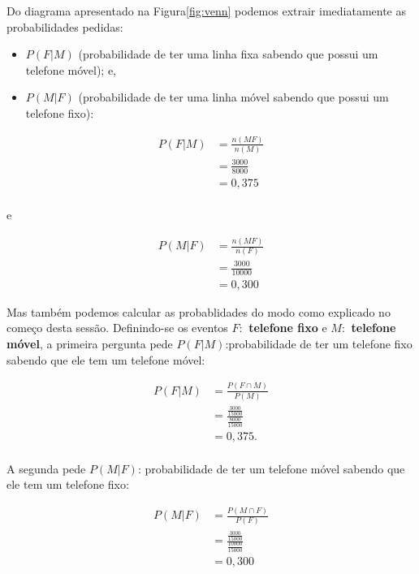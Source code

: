 \documentclass[
]{book}
\providecommand{\tightlist}{%
  \setlength{\itemsep}{0pt}\setlength{\parskip}{0pt}}
\begin{document}
\hfill\break

Do diagrama apresentado na Figura\ref{fig:venn} podemos extrair imediatamente as probabilidades pedidas:

\hfill\break

\begin{itemize}
\tightlist
\item
  \(P(F|M)\) (probabilidade de ter uma linha fixa sabendo que possui um telefone móvel); e,
\item
  \(P(M|F)\) (probabilidade de ter uma linha móvel sabendo que possui um telefone fixo):
\end{itemize}

\hfill\break

\begin{align*}
P(F|M) & = \frac{n(MF)}{n(M)}\\
       & =\frac{3000}{8000}\\
       & = 0,375 
\end{align*}\\

e

\hfill\break

\begin{align*}
P(M|F) & = \frac{n(MF)}{n(F)} \\
       & =\frac{3000}{10000} \\
       & = 0,300 
\end{align*}

\hfill\break

Mas também podemos calcular as probablidades do modo como explicado no começo desta sessão. Definindo-se os eventos \textbf{\(F:\) telefone fixo} e \textbf{\(M:\) telefone móvel}, a primeira pergunta pede \(P(F|M)\):probabilidade de ter um telefone fixo sabendo que ele tem um telefone móvel:

\hfill\break

\begin{align*}
P(F|M) & =  \frac{P(F \cap M)}{P(M)} \\
       & = \frac{ \frac{3000}{15000} }{\frac{8000}{15000} }\\
       & = 0,375.
\end{align*}\\

A segunda pede \(P(M|F)\): probabilidade de ter um telefone móvel sabendo que ele tem um telefone fixo:

\hfill\break

\begin{align*}
P(M|F) & = \frac{P(M \cap F)}{P(F)} \\
       & = \frac{ \frac{3000}{15000} }{\frac{10000}{15000} } \\
       & = 0,300
\end{align*}
\end{document}
